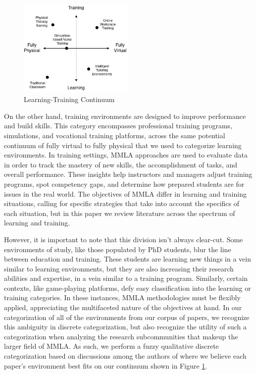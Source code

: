 \documentclass[manuscript,screen,review]{acmart}
\begin{document}
\begin{figure}
    \centering
    \includegraphics[width=0.5\textwidth]{img/LearningTrainingContinuum.jpg}
    \caption{Learning-Training Continuum}
    \label{fig:ltcontinuum}
\end{figure}

On the other hand, training environments are designed to improve performance and build skills. This category encompasses professional training programs, simulations, and vocational training platforms, across the same potential continuum of fully virtual to fully physical that we used to categorize learning environments. In training settings, MMLA approaches are used to evaluate data in order to track the mastery of new skills, the accomplishment of tasks, and overall performance. These insights help instructors and managers adjust training programs, spot competency gaps, and determine how prepared students are for issues in the real world. The objectives of MMLA differ in learning and training situations, calling for specific strategies that take into account the specifics of each situation, but in this paper we review literature across the spectrum of learning and training.

However, it is important to note that this division isn't always clear-cut. Some environments of study, like those populated by PhD students, blur the line between education and training. These students are learning new things in a vein similar to learning environments, but they are also increasing their research abilities and expertise, in a vein similar to a training program. Similarly, certain contexts, like game-playing platforms, defy easy classification into the learning or training categories. In these instances, MMLA methodologies must be flexibly applied, appreciating the multifaceted nature of the objectives at hand. In our categorization of all of the environments from our corpus of papers, we recognize this ambiguity in discrete categorization, but also recognize the utility of such a categorization when analyzing the research subcommunities that makeup the larger field of MMLA. As such, we perform a fuzzy qualitative discrete categorization based on discussions among the authors of where we believe each paper’s environment best fits on our continuum shown in Figure \ref{fig:ltcontinuum}.
\end{document}
